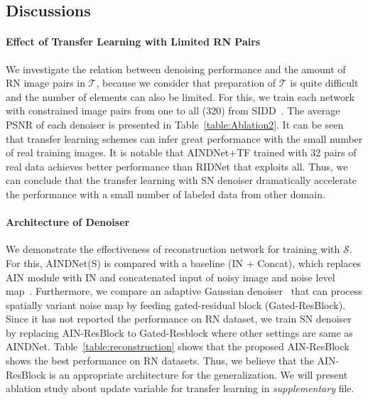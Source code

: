 \documentclass[10pt,twocolumn,letterpaper]{article}
\begin{document}
\subsection{Discussions}
\paragraph{Effect of Transfer Learning with Limited RN Pairs}
We investigate the relation between denoising performance and the amount of RN image pairs in $\mathcal{T}$, 
because we consider that preparation of $\mathcal{T}$ is quite difficult and the number of elements can also be limited. 
For this, we train each network with constrained image pairs from one to all (320) from SIDD~\cite{abdelhamed2018high}.
The average PSNR of each denoiser is presented in Table~\ref{table:Ablation2}. 
It can be seen that transfer learning schemes can infer great performance with the small number of real training images. 
It is notable that AINDNet+TF trained with 32 pairs of real data achieves better performance than RIDNet that exploits all.
Thus, we can conclude that the transfer learning with SN denoiser dramatically accelerate the performance with a small number of labeled data from other domain.

\paragraph{Architecture of Denoiser}


We demonstrate the effectiveness of reconstruction network for training with $\mathcal{S}$.
For this, AINDNet(S) is compared with a baseline (IN + Concat), which replaces AIN module with IN and concatenated input of noisy image and noise level map~\cite{zhang2017learning,zhang2018ffdnet}. 
Furthermore, we compare an adaptive Gaussian denoiser~\cite{kim2019adaptively} that can process spatially variant noise map by feeding gated-residual block (Gated-ResBlock).
Since it has not reported the performance on RN dataset, 
we train SN denoiser by replacing AIN-ResBlock to Gated-Resblock where other settings are same as AINDNet.
Table~\ref{table:reconstruction} shows that the proposed AIN-ResBlock shows the best performance on RN datasets.
Thus, we believe that the AIN-ResBlock is an appropriate architecture for the generalization.
We will present ablation study about update variable for transfer learning in \textit{supplementary} file.
\end{document}
